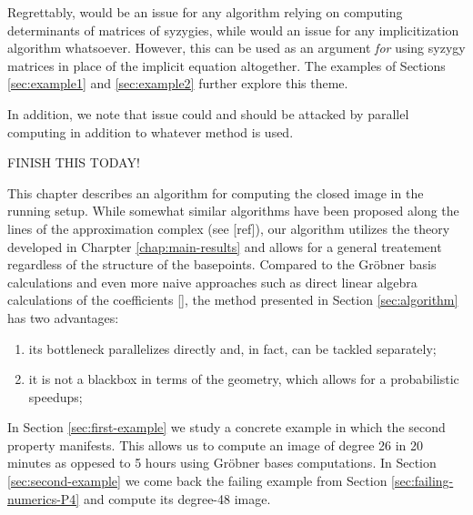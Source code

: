\documentclass[fleqn,reqno]{amsart}
\newcounter{chapter}
\numberwithin{first}{chapter}
\begin{document}
\begin{paragraf*}
Regrettably,
 would be an issue for any algorithm
relying on computing determinants of matrices of syzygies,
while 
would an issue for any implicitization algorithm whatsoever.
However, this can be used as an argument {\em for}
using syzygy matrices in place of the implicit equation altogether.
The examples of Sections \ref{sec:example1} and \ref{sec:example2} further explore this theme.

In addition, we note that issue 
could and should be attacked by parallel computing in addition to whatever method is used.
\end{paragraf*}


FINISH THIS TODAY!


\newpage
[also mention that when $d=e$ this is just solving a system of linear equations for each of the coefficients
of $P(\mathbf x)$. See \citet{Wang2004} for an article devoted to this idea.]

\begin{paragraf*}
This chapter describes an algorithm for computing the closed image in the running setup.
While somewhat similar algorithms have been proposed along the lines of
the approximation complex (see [ref]),
our algorithm utilizes the theory developed in Charpter \ref{chap:main-results}
and allows for a general treatement regardless of the structure of the basepoints.
Compared to the Gr\"obner basis calculations and even more naive approaches
such as direct linear algebra calculations of the coefficients [],
the method presented in Section \ref{sec:algorithm} has two advantages:
\begin{enumerate}
\item
its bottleneck parallelizes directly and, in fact, can be tackled separately;
\item
it is not a blackbox in terms of the geometry, which allows for a probabilistic speedups;
\end{enumerate}

In Section \ref{sec:first-example} we study a concrete example in which the second
property manifests.
This allows us to compute an image of degree 26 in 20 minutes as oppesed to 5 hours
using Gr\"obner bases computations.
In Section \ref{sec:second-example} we come back the failing example from
Section \ref{sec:failing-numerics-P4} and compute its degree-48 image.
\end{paragraf*}
\end{document}

